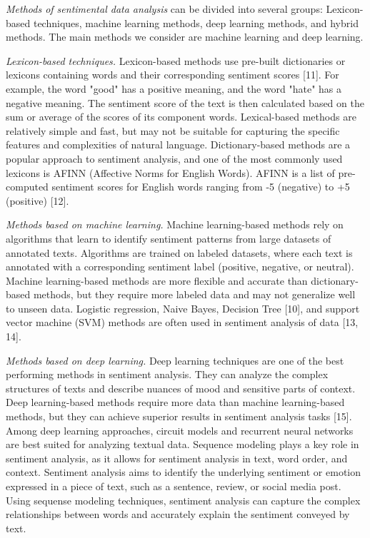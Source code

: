 \begin{multicols}{2}
\emph{Methods of sentimental data analysis} can be divided into several
groups: Lexicon-based techniques, machine learning methods, deep
learning methods, and hybrid methods. The main methods we consider are
machine learning and deep learning.

\emph{Lexicon-based techniques.} Lexicon-based methods use pre-built
dictionaries or lexicons containing words and their corresponding
sentiment scores {[}11{]}. For example, the word "good" has a positive
meaning, and the word "hate" has a negative meaning. The sentiment score
of the text is then calculated based on the sum or average of the scores
of its component words. Lexical-based methods are relatively simple and
fast, but may not be suitable for capturing the specific features and
complexities of natural language. Dictionary-based methods are a popular
approach to sentiment analysis, and one of the most commonly used
lexicons is AFINN (Affective Norms for English Words). AFINN is a list
of pre-computed sentiment scores for English words ranging from -5
(negative) to +5 (positive) {[}12{]}.

\emph{Methods based on machine learning.} Machine learning-based methods
rely on algorithms that learn to identify sentiment patterns from large
datasets of annotated texts. Algorithms are trained on labeled datasets,
where each text is annotated with a corresponding sentiment label
(positive, negative, or neutral). Machine learning-based methods are
more flexible and accurate than dictionary-based methods, but they
require more labeled data and may not generalize well to unseen data.
Logistic regression, Naive Bayes, Decision Tree {[}10{]}, and support
vector machine (SVM) methods are often used in sentiment analysis of
data {[}13, 14{]}.

\emph{Methods based on deep learning.} Deep learning techniques are one
of the best performing methods in sentiment analysis. They can analyze
the complex structures of texts and describe nuances of mood and
sensitive parts of context. Deep learning-based methods require more
data than machine learning-based methods, but they can achieve superior
results in sentiment analysis tasks {[}15{]}. Among deep learning
approaches, circuit models and recurrent neural networks are best suited
for analyzing textual data. Sequence modeling plays a key role in
sentiment analysis, as it allows for sentiment analysis in text, word
order, and context. Sentiment analysis aims to identify the underlying
sentiment or emotion expressed in a piece of text, such as a sentence,
review, or social media post. Using sequense modeling techniques,
sentiment analysis can capture the complex relationships between words
and accurately explain the sentiment conveyed by text.


\end{multicols}
